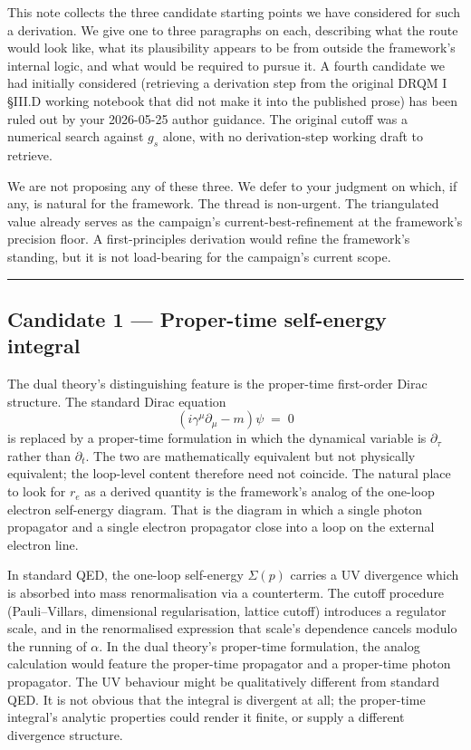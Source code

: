 \documentclass[
  11pt,
]{article}
\begin{document}
This note collects the three candidate starting points we have
considered for such a derivation. We give one to three paragraphs on
each, describing what the route would look like, what its plausibility
appears to be from outside the framework's internal logic, and what
would be required to pursue it. A fourth candidate we had initially
considered (retrieving a derivation step from the original DRQM I §III.D
working notebook that did not make it into the published prose) has been
ruled out by your 2026-05-25 author guidance. The original cutoff was a
numerical search against \(g_s\) alone, with no derivation-step working
draft to retrieve.

We are not proposing any of these three. We defer to your judgment on
which, if any, is natural for the framework. The thread is non-urgent.
The triangulated value already serves as the campaign's
current-best-refinement at the framework's precision floor. A
first-principles derivation would refine the framework's standing, but
it is not load-bearing for the campaign's current scope.

\begin{center}\rule{0.5\linewidth}{0.5pt}\end{center}

\hypertarget{candidate-1-proper-time-self-energy-integral}{%
\subsection{Candidate 1 --- Proper-time self-energy
integral}\label{candidate-1-proper-time-self-energy-integral}}

The dual theory's distinguishing feature is the proper-time first-order
Dirac structure. The standard Dirac equation \[
(i\gamma^\mu \partial_\mu - m)\psi \;=\; 0 \tag{3}
\] is replaced by a proper-time formulation in which the dynamical
variable is \(\partial_\tau\) rather than \(\partial_t\). The two are
mathematically equivalent but not physically equivalent; the loop-level
content therefore need not coincide. The natural place to look for
\(r_e\) as a derived quantity is the framework's analog of the one-loop
electron self-energy diagram. That is the diagram in which a single
photon propagator and a single electron propagator close into a loop on
the external electron line.

In standard QED, the one-loop self-energy \(\Sigma(p)\) carries a UV
divergence which is absorbed into mass renormalisation via a
counterterm. The cutoff procedure (Pauli--Villars, dimensional
regularisation, lattice cutoff) introduces a regulator scale, and in the
renormalised expression that scale's dependence cancels modulo the
running of \(\alpha\). In the dual theory's proper-time formulation, the
analog calculation would feature the proper-time propagator and a
proper-time photon propagator. The UV behaviour might be qualitatively
different from standard QED. It is not obvious that the integral is
divergent at all; the proper-time integral's analytic properties could
render it finite, or supply a different divergence structure.
\end{document}
